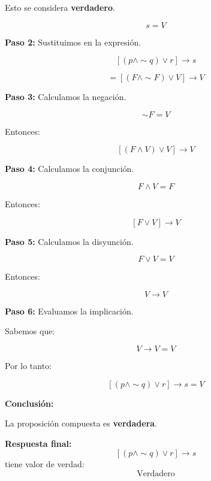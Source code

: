\documentclass[12pt]{article}
\begin{document}
\begin{enumerate}
\begin{enumerate}[label=\alph*)]
\begin{itemize}
			Esto se considera \textbf{verdadero}.
			
			\[
			s=V
			\]
		\end{itemize}
		
		\textbf{Paso 2:} Sustituimos en la expresión.
		
		\[
		[(p\land \sim q)\lor r]\to s
		\]
		
		\[
		=[(F\land \sim F)\lor V]\to V
		\]
		
		\textbf{Paso 3:} Calculamos la negación.
		
		\[
		\sim F = V
		\]
		
		Entonces:
		
		\[
		[(F\land V)\lor V]\to V
		\]
		
		\textbf{Paso 4:} Calculamos la conjunción.
		
		\[
		F\land V = F
		\]
		
		Entonces:
		
		\[
		[F\lor V]\to V
		\]
		
		\textbf{Paso 5:} Calculamos la disyunción.
		
		\[
		F\lor V = V
		\]
		
		Entonces:
		
		\[
		V\to V
		\]
		
		\textbf{Paso 6:} Evaluamos la implicación.
		
		Sabemos que:
		
		\[
		V\to V = V
		\]
		
		Por lo tanto:
		
		\[
		[(p\land \sim q)\lor r]\to s = V
		\]
		
		\textbf{Conclusión:}
		
		La proposición compuesta es \textbf{verdadera}.
		
		\textbf{Respuesta final:}
		\[
		[(p\land \sim q)\lor r]\to s
		\]
		tiene valor de verdad:
		\[
		\boxed{\text{Verdadero}}
		\]
		
	\end{enumerate}
	
\end{enumerate}
\end{document}
